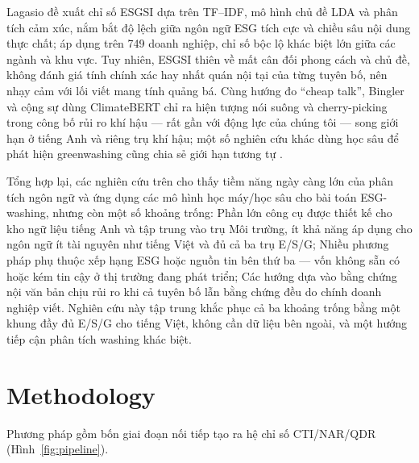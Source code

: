 \documentclass[runningheads]{llncs}
\begin{document}
Lagasio \cite{lagasio2024esg} đề xuất chỉ số ESGSI dựa trên TF--IDF, mô hình chủ đề LDA và phân tích cảm xúc, nắm bắt độ lệch giữa ngôn ngữ ESG tích cực và chiều sâu nội dung thực chất; áp dụng trên 749 doanh nghiệp, chỉ số bộc lộ khác biệt lớn giữa các ngành và khu vực. Tuy nhiên, ESGSI thiên về mất cân đối phong cách và chủ đề, không đánh giá tính chính xác hay nhất quán nội tại của từng tuyên bố, nên nhạy cảm với lối viết mang tính quảng bá. Cùng hướng đo ``cheap talk'', Bingler và cộng sự \cite{bingler2022cheap} dùng ClimateBERT chỉ ra hiện tượng nói suông và cherry-picking trong công bố rủi ro khí hậu --- rất gần với động lực của chúng tôi --- song giới hạn ở tiếng Anh và riêng trụ khí hậu; một số nghiên cứu khác dùng học sâu để phát hiện greenwashing cũng chia sẻ giới hạn tương tự \cite{zhao2023detecting}.

Tổng hợp lại, các nghiên cứu trên cho thấy tiềm năng ngày càng lớn của phân tích ngôn ngữ và ứng dụng các mô hình học máy/học sâu cho bài toán ESG-washing, nhưng còn một số khoảng trống: Phần lớn công cụ được thiết kế cho kho ngữ liệu tiếng Anh và tập trung vào trụ Môi trường, ít khả năng áp dụng cho ngôn ngữ ít tài nguyên như tiếng Việt và đủ cả ba trụ E/S/G; Nhiều phương pháp phụ thuộc xếp hạng ESG hoặc nguồn tin bên thứ ba --- vốn không sẵn có hoặc kém tin cậy ở thị trường đang phát triển; Các hướng dựa vào bằng chứng nội văn bản chịu rủi ro khi cả tuyên bố lẫn bằng chứng đều do chính doanh nghiệp viết. Nghiên cứu này tập trung khắc phục cả ba khoảng trống bằng một khung đầy đủ E/S/G cho tiếng Việt, không cần dữ liệu bên ngoài, và một hướng tiếp cận phân tích washing khác biệt.

\section{Methodology}
Phương pháp gồm bốn giai đoạn nối tiếp tạo ra hệ chỉ số CTI/NAR/QDR (Hình~\ref{fig:pipeline}).
\end{document}
